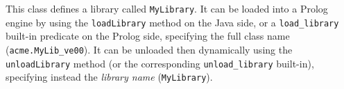 This class defines a library called \texttt{MyLibrary}.
%
It can be loaded into a Prolog engine by using the
\texttt{loadLibrary} method on the Java side, or a
\texttt{load\_library} built-in predicate on the Prolog side,
specifying the full class name (\texttt{acme.MyLib\_{ve00}}).
%
It can be unloaded then dynamically using the \texttt{unloadLibrary}
method (or the corresponding \texttt{unload\_library} built-in),
specifying instead the \textit{library name} (\texttt{MyLibrary}).
